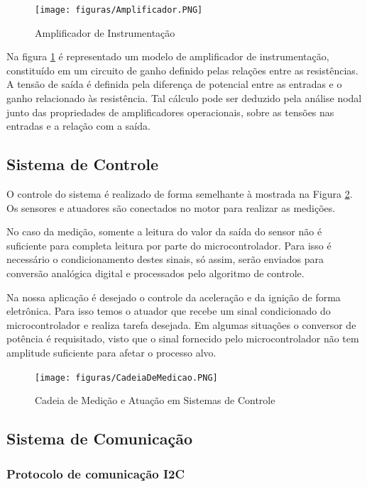 \begin{figure}[h!]
	\centering
	\texttt{[image: figuras/Amplificador.PNG]}
	\caption{Amplificador de Instrumentação \cite{SMAR}}
	\label{amplificadorDeInstrumentacao}
\end{figure}

Na figura \ref{amplificadorDeInstrumentacao} é representado um modelo de amplificador de instrumentação, constituído em um circuito de ganho definido pelas relações entre as resistências. A tensão de saída é definida pela diferença de potencial entre as entradas e o ganho relacionado às resistência. Tal cálculo pode ser deduzido pela análise nodal junto das propriedades de amplificadores operacionais, sobre as tensões nas entradas e a relação com a saída.

\subsection{Sistema de Controle}

O controle do sistema é realizado de forma semelhante à mostrada na Figura \ref{CadeiaDeMedicao}. Os sensores e atuadores são conectados no motor para realizar as medições. 

No caso da medição, somente a leitura do valor da saída do sensor não é suficiente para completa leitura por parte do microcontrolador. Para isso é necessário o condicionamento destes sinais, só assim, serão enviados para conversão analógica digital e processados pelo algoritmo de controle.

Na nossa aplicação é desejado o controle da aceleração e da ignição de forma eletrônica. Para isso temos o atuador que recebe um sinal condicionado do microcontrolador e realiza tarefa desejada. Em algumas situações o conversor de potência é requisitado, visto que o sinal fornecido pelo microcontrolador não tem amplitude suficiente para afetar o processo alvo.

\begin{figure}[h!]
	\centering
	\texttt{[image: figuras/CadeiaDeMedicao.PNG]}
	\caption{Cadeia de Medição e Atuação em Sistemas de Controle \cite{SMAR}}
	\label{CadeiaDeMedicao}
\end{figure}

\subsection{Sistema de Comunicação}

\subsubsection{Protocolo de comunicação I2C}

